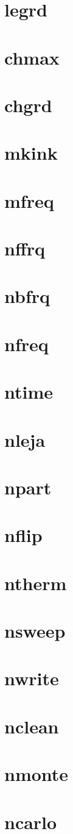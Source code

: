 \section{legrd}
\section{chmax}
\section{chgrd}
\section{mkink}
\section{mfreq}
\section{nffrq}
\section{nbfrq}
\section{nfreq}
\section{ntime}
\section{nleja}
\section{npart}
\section{nflip}
\section{ntherm}
\section{nsweep}
\section{nwrite}
\section{nclean}
\section{nmonte}
\section{ncarlo}
